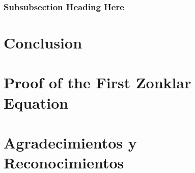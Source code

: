 \documentclass[journal]{IEEEtran}
\begin{document}
\subsubsection{Subsubsection Heading Here}

\section{Conclusion}






\appendices
\section{Proof of the First Zonklar Equation}





\section*{Agradecimientos y Reconocimientos}







 
\end{document}
